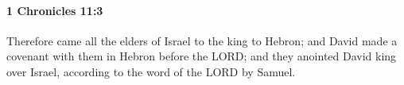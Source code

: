 
		\paragraph{1 Chronicles 11:3} %
			\label{1CHRONICLES-11-3}

			Therefore came all the elders of Israel to the king to Hebron; and David made a covenant with them in Hebron before the LORD; and they anointed David king over Israel, according to the word of the LORD by Samuel.


